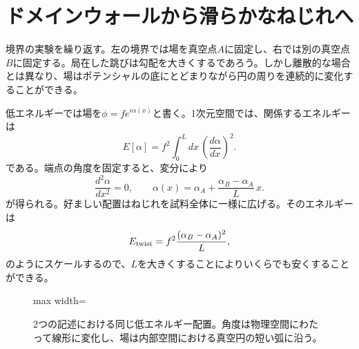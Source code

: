 \section{ドメインウォールから滑らかなねじれへ}

境界の実験を繰り返す。左の境界では場を真空点\(A\)に固定し、右では別の真空点\(B\)に固定する。局在した跳びは勾配を大きくするであろう。しかし離散的な場合とは異なり、場はポテンシャルの底にとどまりながら円の周りを連続的に変化することができる。

低エネルギーでは場を\(\phi=f e^{i\alpha(x)}\)と書く。1次元空間では、関係するエネルギーは
\begin{equation}
  E[\alpha]
  =f^2\int_0^L dx\,\left(\frac{d\alpha}{dx}\right)^2.
  \label{eq:l07-angle-functional}
\end{equation}
である。端点の角度を固定すると、変分により
\begin{equation}
  \frac{d^2\alpha}{dx^2}=0,
  \qquad
  \alpha(x)=\alpha_A+
    \frac{\alpha_B-\alpha_A}{L}\,x.
  \label{eq:l07-linear-twist}
\end{equation}
が得られる。好ましい配置はねじれを試料全体に一様に広げる。そのエネルギーは
\begin{equation}
  E_{\rm twist}
  =f^2\frac{(\alpha_B-\alpha_A)^2}{L},
  \label{eq:l07-twist-energy}
\end{equation}
のようにスケールするので、\(L\)を大きくすることによりいくらでも安くすることができる。

\begin{figure}[htbp]
\centering
\begin{adjustbox}{max width=\linewidth}
\end{adjustbox}
\caption{2つの記述における同じ低エネルギー配置。角度は物理空間にわたって線形に変化し、場は内部空間における真空円の短い弧に沿う。}
\end{figure}

